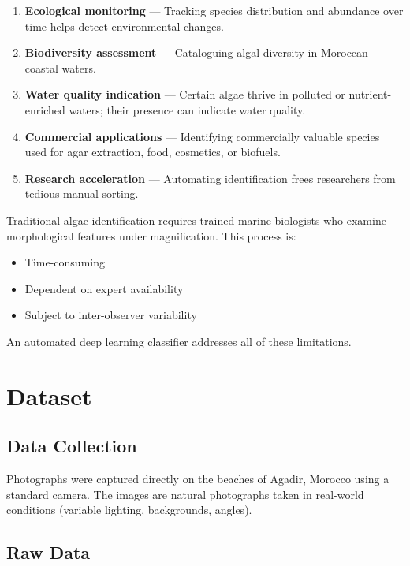 \documentclass[12pt,a4paper]{article}
\begin{document}
\begin{enumerate}
    \item \textbf{Ecological monitoring} --- Tracking species distribution and abundance over time helps detect environmental changes.
    \item \textbf{Biodiversity assessment} --- Cataloguing algal diversity in Moroccan coastal waters.
    \item \textbf{Water quality indication} --- Certain algae thrive in polluted or nutrient-enriched waters; their presence can indicate water quality.
    \item \textbf{Commercial applications} --- Identifying commercially valuable species used for agar extraction, food, cosmetics, or biofuels.
    \item \textbf{Research acceleration} --- Automating identification frees researchers from tedious manual sorting.
\end{enumerate}

Traditional algae identification requires trained marine biologists who examine morphological features under magnification. This process is:
\begin{itemize}
    \item Time-consuming
    \item Dependent on expert availability
    \item Subject to inter-observer variability
\end{itemize}

An automated deep learning classifier addresses all of these limitations.

\section{Dataset}

\subsection{Data Collection}

Photographs were captured directly on the beaches of Agadir, Morocco using a standard camera. The images are natural photographs taken in real-world conditions (variable lighting, backgrounds, angles).

\subsection{Raw Data}
\end{document}

